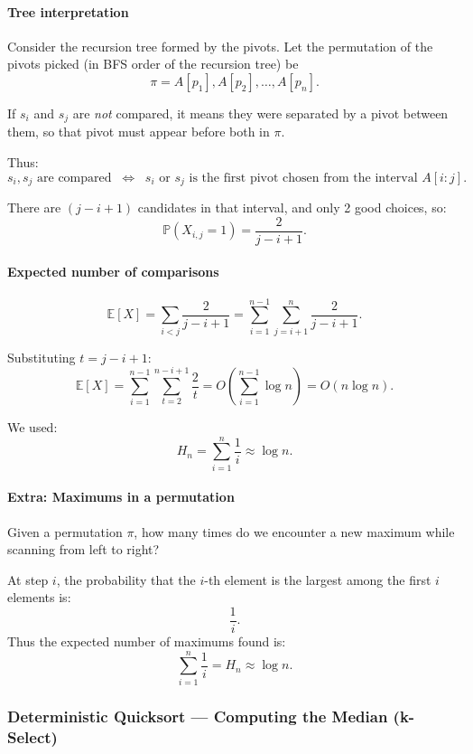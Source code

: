 \documentclass{article}
\begin{document}
\paragraph{Tree interpretation}

Consider the recursion tree formed by the pivots.  
Let the permutation of the pivots picked (in BFS order of the recursion tree) be
\[
\pi = A[p_1], A[p_2], \ldots, A[p_n].
\]

If $s_i$ and $s_j$ are \emph{not} compared, it means they were separated by a pivot between them, so that pivot must appear before both in $\pi$.

Thus:
\[
s_i, s_j \text{ are compared}
\;\;\Longleftrightarrow\;\;
s_i \text{ or } s_j \text{ is the first pivot chosen from the interval } A[i:j].
\]

There are $(j-i+1)$ candidates in that interval, and only 2 good choices, so:
\[
\mathbb{P}(X_{i,j}=1) = \frac{2}{j-i+1}.
\]

\paragraph{Expected number of comparisons}

\[
\mathbb{E}[X]
= \sum_{i<j} \frac{2}{j-i+1}
= \sum_{i=1}^{n-1} \sum_{j=i+1}^n \frac{2}{j-i+1}.
\]

Substituting $t=j-i+1$:
\[
\mathbb{E}[X]
= \sum_{i=1}^{n-1} \sum_{t=2}^{n-i+1} \frac{2}{t}
= O\!\left( \sum_{i=1}^{n-1} \log n \right)
= O(n\log n).
\]

We used:
\[
H_n = \sum_{i=1}^n \frac{1}{i} \approx \log n.
\]

\paragraph{Extra: Maximums in a permutation}

Given a permutation $\pi$, how many times do we encounter a new maximum while scanning from left to right?

At step $i$, the probability that the $i$-th element is the largest among the first $i$ elements is:
\[
\frac{1}{i}.
\]
Thus the expected number of maximums found is:
\[
\sum_{i=1}^n \frac{1}{i} = H_n \approx \log n.
\]

\subsubsection{Deterministic Quicksort — Computing the Median (k-Select)}
\end{document}
